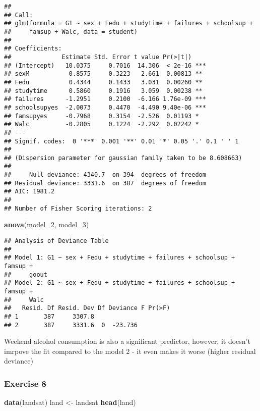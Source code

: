 \documentclass[
]{article}
\newenvironment{Shaded}{\begin{snugshade}}{\end{snugshade}}
\newcommand{\FunctionTok}[1]{\textcolor[rgb]{0.13,0.29,0.53}{\textbf{#1}}}
\newcommand{\NormalTok}[1]{#1}
\newcommand{\OtherTok}[1]{\textcolor[rgb]{0.56,0.35,0.01}{#1}}
\begin{document}
\begin{verbatim}
## 
## Call:
## glm(formula = G1 ~ sex + Fedu + studytime + failures + schoolsup + 
##     famsup + Walc, data = student)
## 
## Coefficients:
##              Estimate Std. Error t value Pr(>|t|)    
## (Intercept)   10.0375     0.7016  14.306  < 2e-16 ***
## sexM           0.8575     0.3223   2.661  0.00813 ** 
## Fedu           0.4344     0.1433   3.031  0.00260 ** 
## studytime      0.5860     0.1916   3.059  0.00238 ** 
## failures      -1.2951     0.2100  -6.166 1.76e-09 ***
## schoolsupyes  -2.0073     0.4470  -4.490 9.40e-06 ***
## famsupyes     -0.7968     0.3154  -2.526  0.01193 *  
## Walc          -0.2805     0.1224  -2.292  0.02242 *  
## ---
## Signif. codes:  0 '***' 0.001 '**' 0.01 '*' 0.05 '.' 0.1 ' ' 1
## 
## (Dispersion parameter for gaussian family taken to be 8.608663)
## 
##     Null deviance: 4340.7  on 394  degrees of freedom
## Residual deviance: 3331.6  on 387  degrees of freedom
## AIC: 1981.2
## 
## Number of Fisher Scoring iterations: 2
\end{verbatim}

\begin{Shaded}
\begin{Highlighting}[]
\FunctionTok{anova}\NormalTok{(model\_2, model\_3)}
\end{Highlighting}
\end{Shaded}

\begin{verbatim}
## Analysis of Deviance Table
## 
## Model 1: G1 ~ sex + Fedu + studytime + failures + schoolsup + famsup + 
##     goout
## Model 2: G1 ~ sex + Fedu + studytime + failures + schoolsup + famsup + 
##     Walc
##   Resid. Df Resid. Dev Df Deviance F Pr(>F)
## 1       387     3307.8                     
## 2       387     3331.6  0  -23.736
\end{verbatim}

Weekend alcohol consumption is also a significant predictor, however, it
doesn't imrpove the fit compared to the model 2 - it even makes it worse
(higher residual deviance)

\subsubsection{Exercise 8}\label{exercise-8}

\begin{Shaded}
\begin{Highlighting}[]
\FunctionTok{data}\NormalTok{(landsat)}
\NormalTok{land }\OtherTok{\textless{}{-}}\NormalTok{ landsat}
\FunctionTok{head}\NormalTok{(land)}
\end{Highlighting}
\end{Shaded}
\end{document}
